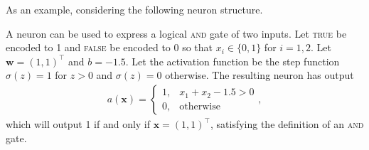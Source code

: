 
\noindent As an example, considering the following neuron structure.

\begin{example}
\label{nnets-and-eg}
A neuron can be used to express a logical \textsc{and} gate of two inputs. Let \textsc{true} be encoded to 1 and \textsc{false} be encoded to 0 so that $x_i \in \{0,1\}$ for $i=1,2$. Let $\mathbf{w} = (1, 1)^\intercal$ and $b = -1.5$. Let the activation function be the step function $\sigma(z) = 1$ for $z > 0$ and $\sigma(z) = 0$ otherwise. The resulting neuron has output
\begin{align*}
	a(\mathbf{x}) = \begin{cases}
		1, & x_1 + x_2 - 1.5 > 0\\
		0, & \text{otherwise}
	\end{cases},
\end{align*}
which will output 1 if and only if $\mathbf{x} = (1, 1)^\intercal$, satisfying the definition of an \textsc{and} gate.
\end{example}

